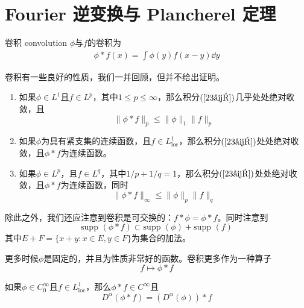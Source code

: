 \documentclass[lang = cn, %
scheme = chinese          %
]
{elegantbook}             %
\newcommand{\sub}{\subset}             %
\newcommand{\supp}{\text{supp }}
\begin{document}
\chapter{Fourier 逆变换与 Plancherel 定理}

\begin{definition}{卷积 convolution}
	$\phi$与$f$的卷积为
	\begin{gather}
		\label{23式}
		\phi*f(x)=\int \phi(y)f(x-y)\dd y
	\end{gather}
\end{definition}

卷积有一些良好的性质，我们一并回顾，但并不给出证明。

\begin{proposition}
	\begin{enumerate}
		\item 如果$\phi\in L^1$且$f\in L^p$，其中$1\le p \le\infty$，那么积分$(\ref{23式})$几乎处处绝对收敛，且
		\[
		\| \phi*f \|_p
		\le \|\phi\|_1 \|f\|_p
		\]
		\item 如果$\phi$为具有紧支集的连续函数，且$f\in L^1_{\text{loc}}$，那么积分$(\ref{23式})$处处绝对收敛，且$\phi*f$为连续函数。
		\item 如果$\phi\in L^p$，且$f\in L^q$，其中$1/p+1/q=1$，那么积分$(\ref{23式})$处处绝对收敛，且$\phi*f$为连续函数，同时
		\[
		\| \phi*f \|_\infty
		\le \|\phi\|_p \|f\|_q 
		\]
	\end{enumerate}
\end{proposition}

除此之外，我们还应注意到卷积是可交换的：$f*\phi=\phi*f$。同时注意到
\[
\supp(\phi*f)\sub \supp(\phi)+\supp(f)
\]
其中$E+F=\{ x+y:x\in E,y\in F \}$为集合的加法。

更多时候$\phi$是固定的，并且为性质非常好的函数。卷积更多作为一种算子
\[
f\longmapsto \phi*f
\]

\begin{lemma}
	如果$\phi\in C_0^\infty$且$f\in L^1_{\text{loc}}$，那么$\phi*f\in C^\infty$且
	\[
	D^\alpha(\phi*f)=(D^\alpha (\phi))*f
	\]
\end{lemma}
\end{document}
